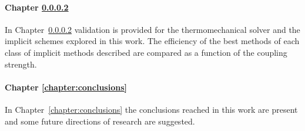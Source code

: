 \paragraph{Chapter \ref{}}
In Chapter~\ref{} validation is provided for the thermomechanical solver and the implicit schemes explored in this work.
The efficiency of the best methods of each class of implicit methods described are compared as a function of the coupling strength.

\paragraph{Chapter \ref{chapter:conclusions}}
In Chapter~\ref{chapter:conclusions} the conclusions reached in this work are present and some future directions of research are suggested.


\newpage\null\thispagestyle{blank}\newpage
